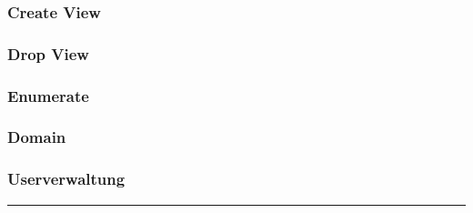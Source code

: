 \begin{multicols}{2}
        \subsubsection{Create View}
            
        \subsubsection{Drop View}
            
        \subsubsection{Enumerate}
            
        \subsubsection{Domain}
            
        \subsubsection{Userverwaltung}
                            
    \end{multicols}
    \hrule